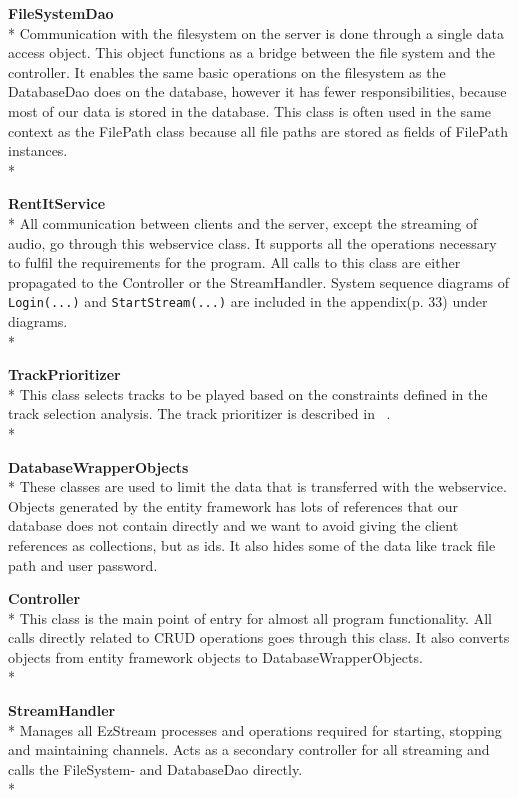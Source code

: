 \documentclass[a4paper,11pt,report]{article}
\begin{document}
\textbf{FileSystemDao} \\*
Communication with the filesystem on the server is done through a single data access object. This object functions as a bridge between the file system and the controller. It enables the same basic operations on the filesystem as the DatabaseDao does on the database, however it has fewer responsibilities, because most of our data is stored in the database. This class is often used in the same context as the FilePath class because all file paths are stored as fields of FilePath instances. \\*

\textbf{RentItService} \\*
All communication between clients and the server, except the streaming of audio, go through this webservice class. It supports all the operations necessary to fulfil the requirements for the program. All calls to this class are either propagated to the Controller or the StreamHandler. System sequence diagrams of \texttt{Login(...)} and \texttt{StartStream(...)} are included in the appendix(p. 33) under diagrams. \\*

\textbf{TrackPrioritizer} \\*
This class selects tracks to be played based on the constraints defined in the track selection analysis. The track prioritizer is described in ~. \\*

\textbf{DatabaseWrapperObjects} \\*
These classes are used to limit the data that is transferred with the webservice. Objects generated by the entity framework has lots of references that our database does not contain directly and we want to avoid giving the client references as collections, but as ids. It also hides some of the data like track file path and user password.

\textbf{Controller} \\*
This class is the main point of entry for almost all program functionality. All calls directly related to CRUD operations goes through this class. It also converts objects from entity framework objects to DatabaseWrapperObjects.\\*

\textbf{StreamHandler} \\*
Manages all EzStream processes and operations required for starting, stopping and maintaining channels. Acts as a secondary controller for all streaming and calls the FileSystem- and DatabaseDao directly. \\*
\end{document}
